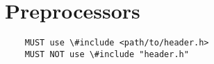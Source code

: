 \section{Preprocessors}
\begin{lstlisting}
    MUST use \#include <path/to/header.h>
    MUST NOT use \#include "header.h"
\end{lstlisting}
